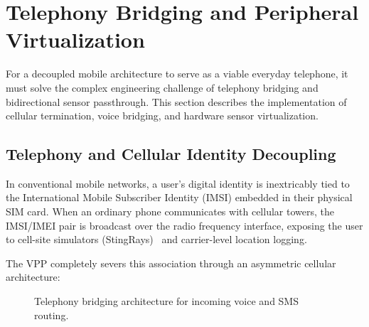 \section{Telephony Bridging and Peripheral Virtualization}
\label{sec:telephony}

For a decoupled mobile architecture to serve as a viable everyday telephone, it must solve the complex engineering challenge of telephony bridging and bidirectional sensor passthrough. This section describes the implementation of cellular termination, voice bridging, and hardware sensor virtualization.

\subsection{Telephony and Cellular Identity Decoupling}
In conventional mobile networks, a user's digital identity is inextricably tied to the International Mobile Subscriber Identity (IMSI) embedded in their physical SIM card. When an ordinary phone communicates with cellular towers, the IMSI/IMEI pair is broadcast over the radio frequency interface, exposing the user to cell-site simulators (StingRays)~\cite{vandenbroek2015imsi} and carrier-level location logging.

The VPP completely severs this association through an asymmetric cellular architecture:

\begin{figure}[h!]
\centering
{}
\caption{Telephony bridging architecture for incoming voice and SMS routing.}
\label{fig:telephony_bridge}
\end{figure}

